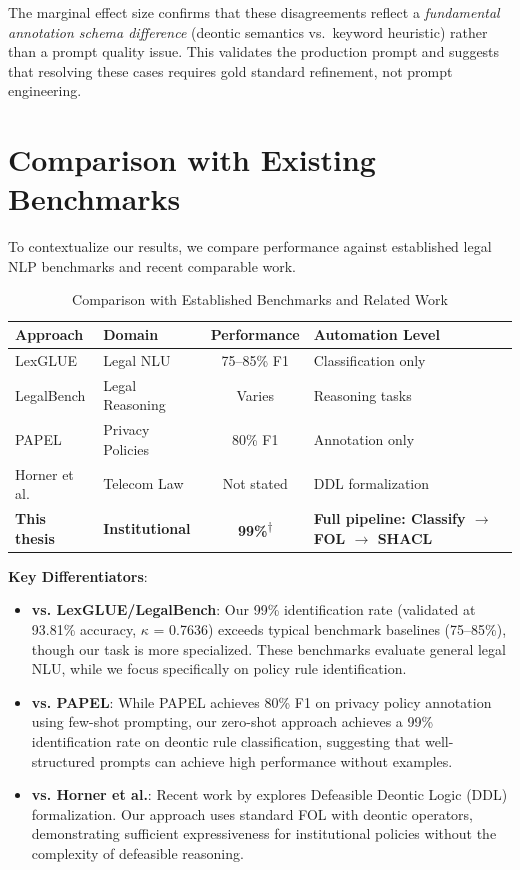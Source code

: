 The marginal effect size confirms that these disagreements reflect a \textit{fundamental annotation schema difference} (deontic semantics vs.\ keyword heuristic) rather than a prompt quality issue. This validates the production prompt and suggests that resolving these cases requires gold standard refinement, not prompt engineering.

\section{Comparison with Existing Benchmarks}

To contextualize our results, we compare performance against established legal NLP benchmarks and recent comparable work.

\begin{table}[htbp]
\centering
\caption{Comparison with Established Benchmarks and Related Work}
\label{tab:benchmark-comparison}
\begin{tabular}{p{4.5cm}p{3cm}cp{3.5cm}}
\toprule
\textbf{Approach} & \textbf{Domain} & \textbf{Performance} & \textbf{Automation Level} \\
\midrule
LexGLUE \citep{chalkidis2022lexglue} & Legal NLU & 75--85\% F1 & Classification only \\
LegalBench \citep{guha2023legalbench} & Legal Reasoning & Varies & Reasoning tasks \\
PAPEL \citep{goknil2024papel} & Privacy Policies & 80\% F1 & Annotation only \\
Horner et al. \citep{horner2025robust} & Telecom Law & Not stated & DDL formalization \\
\midrule
\textbf{This thesis} & \textbf{Institutional} & \textbf{99\%}\textsuperscript{$\dagger$} & \textbf{Full pipeline: Classify $\rightarrow$ FOL $\rightarrow$ SHACL} \\
\bottomrule
\end{tabular}
\end{table}

\textbf{Key Differentiators}:
\begin{itemize}
    \item \textbf{vs. LexGLUE/LegalBench}: Our 99\% identification rate (validated at 93.81\% accuracy, $\kappa$ = 0.7636) exceeds typical benchmark baselines (75--85\%), though our task is more specialized. These benchmarks evaluate general legal NLU, while we focus specifically on policy rule identification.
    
    \item \textbf{vs. PAPEL}: While PAPEL achieves 80\% F1 on privacy policy annotation using few-shot prompting, our zero-shot approach achieves a 99\% identification rate on deontic rule classification, suggesting that well-structured prompts can achieve high performance without examples.
    
    \item \textbf{vs. Horner et al.}: Recent work by \citet{horner2025robust} explores Defeasible Deontic Logic (DDL) formalization. Our approach uses standard FOL with deontic operators, demonstrating sufficient expressiveness for institutional policies without the complexity of defeasible reasoning.
\end{itemize}


